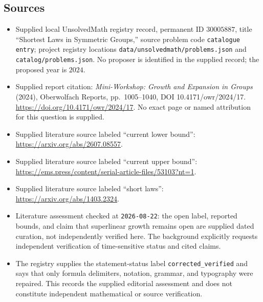 \documentclass[11pt]{article}
\begin{document}
\subsection{Sources}
\begin{itemize}
\item Supplied local UnsolvedMath registry record, permanent ID \(30005887\), title ``Shortest Laws in Symmetric Groups,'' source problem code \texttt{catalogue entry}; project registry locations \texttt{data/unsolvedmath/problems.json} and \texttt{catalog/problems.json}. No proposer is identified in the supplied record; the proposed year is \(2024\).
\item Supplied report citation: \emph{Mini-Workshop: Growth and Expansion in Groups} (2024), Oberwolfach Reports, pp.~1005--1040, DOI 10.4171/owr/2024/17. \url{https://doi.org/10.4171/owr/2024/17}. No exact page or named attribution for this question is supplied.
\item Supplied literature source labeled ``current lower bound'': \url{https://arxiv.org/abs/2607.08557}.
\item Supplied literature source labeled ``current upper bound'': \url{https://ems.press/content/serial-article-files/53103?nt=1}.
\item Supplied literature source labeled ``short laws'': \url{https://arxiv.org/abs/1403.2324}.
\item Literature assessment checked at \texttt{2026-08-22}: the open label, reported bounds, and claim that superlinear growth remains open are supplied dated curation, not independently verified here. The background explicitly requests independent verification of time-sensitive status and cited claims.
\item The registry supplies the statement-status label \texttt{corrected\_verified} and says that only formula delimiters, notation, grammar, and typography were repaired. This records the supplied editorial assessment and does not constitute independent mathematical or source verification.
\end{itemize}
\end{document}
